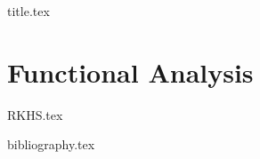\documentclass[a4paper,11pt]{book}
\begin{document}
\frontmatter
{title.tex}

\clearpage
\thispagestyle{empty}

\tableofcontents

\mainmatter
\chapter{Functional Analysis}
{RKHS.tex}


\backmatter

{bibliography.tex}
\end{document}
